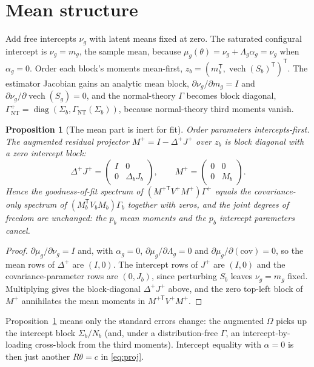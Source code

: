 \documentclass[11pt]{article}
\newcommand{\T}{^{\mathsf T}}
\newcommand{\diag}{\operatorname{diag}}
\newcommand{\vech}{\operatorname{vech}}
\newcommand{\Om}{\Omega}
\theoremstyle{plain}
\newtheorem{proposition}{Proposition}
\theoremstyle{remark}
\begin{document}
\section{Mean structure}
\label{sec:means}

Add free intercepts $\nu_g$ with latent means fixed at zero. The saturated
configural intercept is $\nu_g = m_g$, the sample mean, because
$\mu_g(\theta) = \nu_g + \Lambda_g\alpha_g = \nu_g$ when $\alpha_g = 0$. Order
each block's moments mean-first, $z_b = (m_b\T, \vech(S_b)\T)\T$. The estimator
Jacobian gains an analytic mean block, $\partial\nu_g/\partial m_g = I$ and
$\partial\nu_g/\partial\vech(S_g) = 0$, and the normal-theory
$\Gamma$ becomes block diagonal, $\Gamma^{+}_{\mathrm{NT}} =
\diag(\Sigma_b, \Gamma_{\mathrm{NT}}(\Sigma_b))$, because normal-theory third
moments vanish.

\begin{proposition}[The mean part is inert for fit]
\label{prop:mean-inert}
Order parameters intercepts-first. The augmented residual projector
$M^{+} = I - \Delta^{+} J^{+}$ over $z_b$ is block diagonal with a zero
intercept block:
\[
  \Delta^{+} J^{+}
  = \begin{pmatrix} I & 0 \\ 0 & \Delta_b J_b \end{pmatrix},
  \qquad
  M^{+} = \begin{pmatrix} 0 & 0 \\ 0 & M_b \end{pmatrix}.
\]
Hence the goodness-of-fit spectrum of $(M^{+\mathsf T} V^{+} M^{+})\Gamma^{+}$
equals the covariance-only spectrum of $(M_b\T V_b M_b)\Gamma_b$ together with
zeros, and the joint degrees of freedom are unchanged: the $p_b$ mean moments
and the $p_b$ intercept parameters cancel.
\end{proposition}

\begin{proof}
$\partial\mu_g/\partial\nu_g = I$ and, with $\alpha_g = 0$,
$\partial\mu_g/\partial\Lambda_g = 0$ and $\partial\mu_g/\partial(\text{cov}) =
0$, so the mean rows of $\Delta^{+}$ are $(I, 0)$. The intercept rows of $J^{+}$
are $(I, 0)$ and the covariance-parameter rows are $(0, J_b)$, since perturbing
$S_b$ leaves $\nu_g = m_g$ fixed. Multiplying gives the block-diagonal
$\Delta^{+}J^{+}$ above, and the zero top-left block of $M^{+}$ annihilates the
mean moments in $M^{+\mathsf T} V^{+} M^{+}$.
\end{proof}

Proposition~\ref{prop:mean-inert} means only the standard errors change: the
augmented $\Om$ picks up the intercept block $\Sigma_b/N_b$ (and, under a
distribution-free $\Gamma$, an intercept-by-loading cross-block from the third
moments). Intercept equality with $\alpha = 0$ is then just another
$R\theta = c$ in \eqref{eq:proj}.
\end{document}
